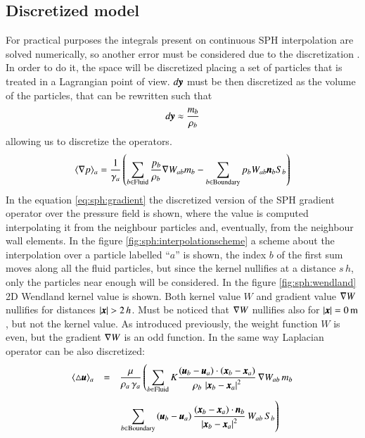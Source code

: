 \subsection{Discretized model}
\label{ss:sph_discretized}
%
For practical purposes the integrals present on continuous SPH interpolation are solved numerically,
so another error must be considered due to the discretization \citep{Quinlan_06,Amicarelli2011279}.
In order to do it, the space will be discretized placing a set of particles that is treated in a
Lagrangian point of view. $d\pmb{y}$ must be then discretized as the volume of the particles, that can
be rewritten such that
%
\begin{eqnarray}
d\pmb{y} \approx \frac{m_b}{\rho_b}
\end{eqnarray}
%
allowing us to discretize the operators.
%
\begin{eqnarray}
\label{eq:sph:gradient}
\langle \nabla p \rangle_a = \frac{1}{\gamma_a} \left(
	  \sum\limits_{b \in \mathrm{Fluid}} \frac{p_b}{\rho_b} \nabla W_{ab} m_b
	- \sum\limits_{b \in \mathrm{Boundary}} p_b W_{ab} \pmb{n}_b S_b
\right)
\end{eqnarray}
%
In the equation \ref{eq:sph:gradient} the discretized version of the SPH gradient operator over the pressure
field is shown, where the value is computed interpolating it from the neighbour particles and, eventually,
from the neighbour wall elements.\rc
%
In the figure \ref{fig:sph:interpolationscheme} a scheme about the interpolation over a particle labelled
``$a$'' is shown, the index $b$ of the first sum moves along all the fluid particles, but since the kernel
nullifies at a distance $s \, h$, only the particles near enough will be considered.\rc
%
In the figure \ref{fig:sph:wendland} 2D Wendland kernel value is shown. Both kernel value $W$ and
gradient value $\nabla W$ nullifies for distances $\vert \pmb{x} \vert > 2 \, h$. Must be noticed that
$\nabla W$ nullifies also for $\vert \pmb{x} \vert = 0 \, \mbox{m}$, but not the kernel value.\rc
%
As introduced previously, the weight function $W$ is even, but the gradient $\nabla W$ is an odd
function.\rc
%
In the same way Laplacian operator can be also discretized:
%
\begin{eqnarray}
\begin{array}{lcl}
\langle \laplacian \bs u \rangle_a & = & 
\dsty{\frac{\mu}{\rho_a \, \gamma_a}} \left(\dsty{
    \sum\limits_{b \in \mathrm{Fluid}}
	K \frac{
		\left(\bs{u}_b - \bs{u}_a \right) \cdot (\bs{x}_b - \bs{x}_a)
	}{
		 \rho_b \, \left\vert \bs{x}_b - \bs{x}_a \right\vert^2
	} \, \gradient  W_{ab} \, m_b }\right.
    \vspace{0.3cm} \\ & & \left.\dsty{
    \sum\limits_{b \in \mathrm{Boundary}}
	\left(\bs{u}_b - \bs{u}_a \right)
	\frac{
		 (\bs{x}_b - \bs{x}_a) \cdot \bs{n}_b
	}{
		 \left\vert \bs{x}_b - \bs{x}_a \right\vert^2
	} \, W_{ab} \, S_b}\right)
\end{array}
\end{eqnarray}
